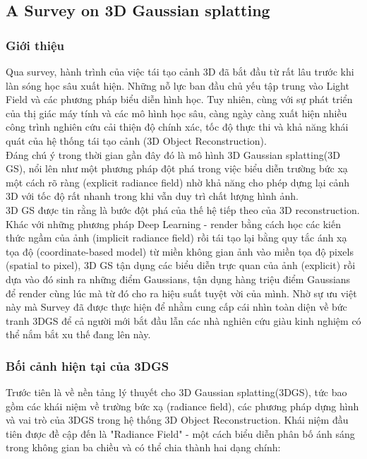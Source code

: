     \subsection{A Survey on 3D Gaussian splatting \cite{b2}}
        \subsubsection{Giới thiệu}
        Qua survey, hành trình của việc tái tạo cảnh 3D đã bắt đầu từ rất lâu trước khi làn sóng học sâu xuất hiện. Những nỗ lực ban đầu chủ yếu tập trung vào Light Field và các phương pháp biểu diễn hình học. Tuy nhiên, cùng với sự phát triển của thị giác máy tính và các mô hình học sâu, càng ngày càng xuất hiện nhiều công trình nghiên cứu cải thiện độ chính xác, tốc độ thực thi và khả năng khái quát của hệ thống tái tạo cảnh (3D Object Reconstruction).\\
        
        Đáng chú ý trong thời gian gần đây đó là mô hình 3D Gaussian splatting(3D GS), nổi lên như một phương pháp đột phá trong việc biểu diễn trường bức xạ một cách rõ ràng (explicit radiance field) nhờ khả năng cho phép dựng lại cảnh 3D với tốc độ rất nhanh trong khi vẫn duy trì chất lượng hình ảnh. \\
        
        3D GS được tin rằng là bước đột phá của thế hệ tiếp theo của 3D reconstruction. Khác với những phương pháp Deep Learning - render bằng cách học các kiến thức ngầm của ảnh (implicit radiance field) rồi tái tạo lại bằng quy tắc ánh xạ tọa độ (coordinate-based model) từ miền không gian ảnh vào miền tọa độ pixels (spatial to pixel), 3D GS tận dụng các biểu diễn trực quan của ảnh (explicit) rồi dựa vào đó sinh ra những điểm Gaussians, tận dụng hàng triệu điểm Gaussians để render cùng lúc mà từ đó cho ra hiệu suất tuyệt vời của mình. Nhờ sự ưu việt này mà Survey đã được thực hiện để nhằm cung cấp cái nhìn toàn diện về bức tranh 3DGS để cả người mới bắt đầu lẫn các nhà nghiên cứu giàu kinh nghiệm có thể nắm bắt xu thế đang lên này. \\

        \subsubsection{Bối cảnh hiện tại của 3DGS}

        Trước tiên là về nền tảng lý thuyết cho 3D Gaussian splatting(3DGS), tức bao gồm các khái niệm về trường bức xạ (radiance field), các phương pháp dựng hình và vai trò của 3DGS trong hệ thống 3D Object Reconstruction. Khái niệm đầu tiên được đề cập đến là "Radiance Field" - một cách biểu diễn phân bố ánh sáng trong không gian ba chiều và có thể chia thành hai dạng chính:
        
